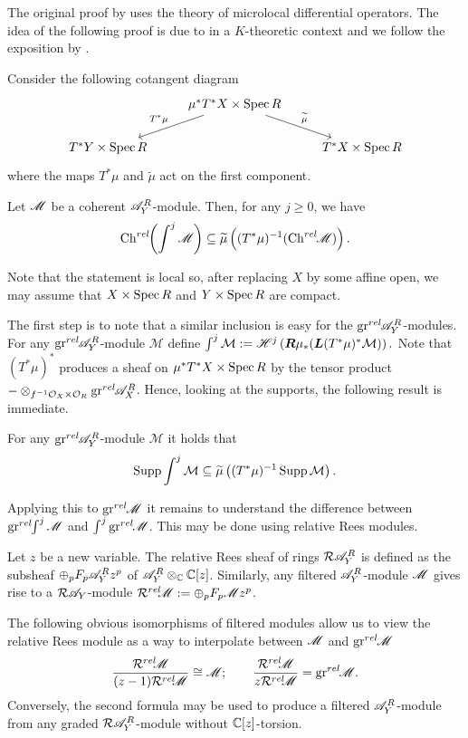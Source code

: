 The original proof by \cite{kashiwara1976b} uses the theory of microlocal differential operators. The idea of the following proof is due to \cite{malgrange1985images} in a $K$-theoretic context and we follow the exposition by \cite{sabbah2011introduction}. %

Consider the following cotangent diagram
$$
\begin{tikzcd}
    & \mu^* T^* X\times \Spec R \arrow[swap]{ld}{T^* \mu} \arrow{rd}{\widetilde{\mu}} & \\
    T^* Y\times \Spec R & & T^*X\times \Spec R
\end{tikzcd}
$$
where the maps $T^*\mu$ and $\widetilde{\mu}$ act on the first component.
\begin{theorem}
    Let $\mathscr{M}$ be a coherent $\mathscr{A}_Y^R$-module. Then, for any $j\geq 0$, we have 
    $$\operatorname{Ch}^{rel}\mkern-5mu\left(\int^j \mathscr{M} \right)\subseteq  \widetilde{\mu}\left((T^*\mu)^{-1}(\operatorname{Ch}^{rel}\mkern-5mu \mathscr{M}) \right).$$
\end{theorem}
Note that the statement is local so, after replacing $X$ by some affine open, we may assume that $X\times \operatorname{Spec} R$ and $Y\times \operatorname{Spec} R$ are compact.

The first step is to note that a similar inclusion is easy for the $\operatorname{gr}^{rel}\mkern-5mu \mathscr{A}_Y^R$-modules. For any $\operatorname{gr}^{rel}\mkern-5mu \mathscr{A}_Y^R$-module $\mathcal{M}$ define $\int^j \mathcal{M} :=  \mathscr{H}^j\left(\boldsymbol{R} \mu_* (\boldsymbol{L}(T^*\mu)^* \mathcal{M})\right).$
Note that $(T^*\mu)^*$ produces a sheaf on $\mu^* T^* X \times \operatorname{Spec} R$ by the tensor product  ${-}\otimes_{f^{-1}\mathcal{O}_X\times \mathcal{O}_{R}} \operatorname{gr}^{rel}\mkern-5mu \mathscr{A}_X^R$. Hence, looking at the supports, the following result is immediate.
\begin{lemma}
    For any $\operatorname{gr}^{rel}\mkern-5mu\mathscr{A}_Y^R$-module $\mathcal{M}$ it holds that
    $$\operatorname{Supp} \int^j \mathcal{M}\subseteq \widetilde{\mu}\left((T^* \mu)^{-1} \operatorname{Supp} \mathcal{M}\right).$$
\end{lemma}
Applying this to $\operatorname{gr}^{rel}\mkern-5mu \mathscr{M}$ it remains to understand the difference between $\operatorname{gr}^{rel}\mkern-5mu\int^j \mathscr{M}$ and $\int^j \operatorname{gr}^{rel}\mkern-5mu \mathscr{M}$. This may be done using relative Rees modules.
\begin{definition}
    Let $z$ be a new variable. The relative Rees sheaf of rings $\mathcal{R}\mathscr{A}_Y^R$ is defined as the subsheaf $\oplus_p F_p \mathscr{A}_Y^R z^p $ of $\mathscr{A}_Y^R \otimes_{\mathbb{C}} \mathbb{C}[z]$. Similarly, any filtered $\mathscr{A}_Y^R$-module $\mathscr{M}$ gives rise to a $\mathcal{R}\mathscr{A}_Y$-module $\mathcal{R}^{rel}\mkern-5mu\mathscr{M} := \oplus_p F_p \mathscr{M} z^p$.
\end{definition}
The following obvious isomorphisms of filtered modules allow us to view the relative Rees module as a way to interpolate between $\mathscr{M}$ and $\operatorname{gr}^{rel}\mkern-5mu\mathscr{M}$
$$\frac{\mathcal{R}^{rel}\mkern-5mu\mathscr{M}}{(z-1)\mathcal{R}^{rel}\mkern-5mu\mathscr{M}} \cong \mathscr{M}; \qquad \frac{\mathcal{R}^{rel}\mkern-5mu\mathscr{M}}{z\mathcal{R}^{rel}\mkern-5mu\mathscr{M}} = \operatorname{gr}^{rel}\mkern-5mu \mathscr{M}.$$
Conversely, the second formula may be used to produce a filtered $\mathscr{A}_Y^R$-module from any graded $\mathcal{R}\mathscr{A}_Y^R$-module without $\mathbb{C}[z]$-torsion.

